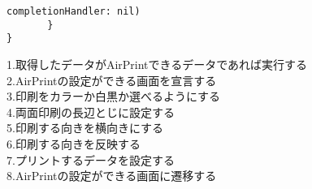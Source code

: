 \begin{description}
\begin{lstlisting}[basicstyle=\ttfamily\footnotesize, frame=single]
            completionHandler: nil)
       }
}
 \end{lstlisting}
 1.取得したデータがAirPrintできるデータであれば実行する\\
 2.AirPrintの設定ができる画面を宣言する \\
 3.印刷をカラーか白黒か選べるようにする \\
 4.両面印刷の長辺とじに設定する \\
 5.印刷する向きを横向きにする \\
 6.印刷する向きを反映する \\
 7.プリントするデータを設定する \\
 8.AirPrintの設定ができる画面に遷移する \\
\end{description}

